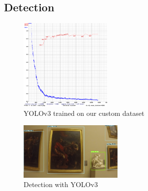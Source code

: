 \subsection{Detection}



\begin{figure}[b!]
    \centering
        \includegraphics[width=0.4\textwidth]{pictures/painting_detection/training-v3.png}
    \caption{YOLOv3 trained on our custom dataset}
    \label{fig:training-v3}
\end{figure}

\begin{figure}[h!]
    \centering
        \includegraphics[width=0.45\textwidth]{pictures/painting_detection/yolo-detection2.PNG}
    \caption{Detection with YOLOv3}
    \label{fig:yolo_detection}
\end{figure}


